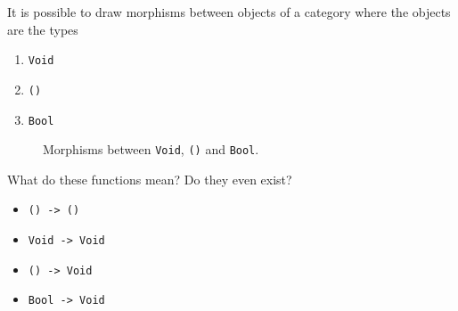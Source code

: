 \begin{remark}
    It is possible to draw morphisms between objects of a category where the objects are the types
    \begin{enumerate}
        \item \texttt{Void}
        \item \texttt{()}
        \item \texttt{Bool}
    \end{enumerate}
    
    \begin{figure}[H]
        \centering
        \caption{Morphisms between \texttt{Void}, \texttt{()} and \texttt{Bool}.}
        \label{fig:morphism-between-types}
    \end{figure}
    
    What do these functions mean? Do they even exist?
    \begin{itemize}
        \item \texttt{() -> ()}
        \item \texttt{Void -> Void}
        \item \texttt{() -> Void}
        \item \texttt{Bool -> Void}
    \end{itemize}
\end{remark}
